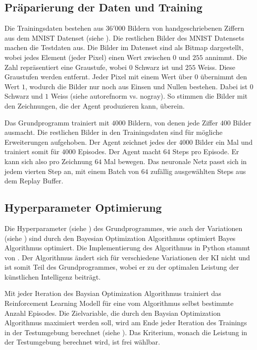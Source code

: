 \subsection{Präparierung der Daten und Training}
\label{sub:m_grund_data}
Die Trainingsdaten bestehen aus $36'000$ Bildern von handgeschriebenen Ziffern
aus dem MNIST Datenset (siehe ). Die restlichen Bilder des
MNIST Datensets machen die Testdaten aus. Die Bilder im Datenset sind als Bitmap
dargestellt, wobei jedes Element (jeder Pixel) einen Wert zwischen $0$ und $255$
annimmt. Die Zahl repräsentiert eine Graustufe, wobei $0$ Schwarz ist und $255$
Weiss. Diese Graustufen werden entfernt. Jeder Pixel mit einem Wert über $0$
übernimmt den Wert $1$, wodurch die Bilder nur noch aus Einsen und Nullen
bestehen. Dabei ist $0$ Schwarz und $1$ Weiss (siehe autoref{norm vs. nogray}).
So stimmen die Bilder mit den Zeichnungen, die der Agent produzieren kann,
überein.

Das Grundprogramm trainiert mit $4000$ Bildern, von denen jede Ziffer $400$
Bilder ausmacht. Die restlichen Bilder in den Trainingsdaten sind für mögliche
Erweiterungen aufgehoben. Der Agent zeichnet jedes der $4000$ Bilder ein Mal und
trainiert somit für $4000$ Episodes. Der Agent macht $64$ Steps pro Episode. Er
kann sich also pro Zeichnung $64$ Mal bewegen. Das neuronale Netz passt sich in
jedem vierten Step an, mit einem Batch von $64$ zufällig ausgewählten Steps aus
dem Replay Buffer.

\subsection{Hyperparameter Optimierung}
\label{sub:m_grund_hyper}
Die Hyperparameter (siehe ) des Grundprogrammes, wie auch
der Variationen (siehe ) sind durch den Bayesian
Optimization Algorithmus optimiert Bayes Algorithmus optimiert. Die
Implementierung des Algorithmus in Python stammt von
\cite{fernando_bayesian_2022}. Der Algorithmus ändert sich für verschiedene
Variationen der KI nicht und ist somit Teil des Grundprogrammes, wobei er zu der
optimalen Leistung der künstlichen Intelligenz beiträgt. 

Mit jeder Iteration des Baysian Optimization Algorithmus trainiert das
Reinforcement Learning Modell für eine vom Algorithmus selbst bestimmte Anzahl
Episodes. Die Zielvariable, die durch den Baysian Optimization Algorithmus
maximiert werden soll, wird am Ende jeder Iteration des Trainings in der
Testumgebung berechnet (siehe ). Das Kriterium, wonach
die Leistung in der Testumgebung berechnet wird, ist frei wählbar.


